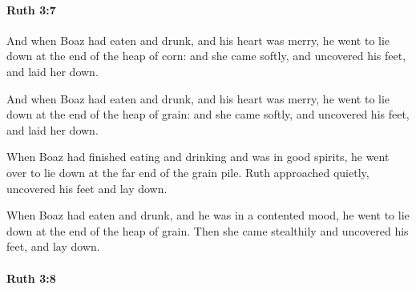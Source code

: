 		\paragraph{Ruth 3:7} %
			\label{RUTH-3-7}

			And when Boaz had eaten and drunk, and his heart was merry, he went to lie down at the end of the heap of corn: and she came softly, and uncovered his feet, and laid her down.

			\begin{versebox}
					\item[BHS] 
					\item[LXX] 
					\item[ASV] And when Boaz had eaten and drunk, and his heart was merry, he went to lie down at the end of the heap of grain: and she came softly, and uncovered his feet, and laid her down.
					\item[NIV] When Boaz had finished eating and drinking and was in good spirits, he went over to lie down at the far end of the grain pile. Ruth approached quietly, uncovered his feet and lay down.
					\item[NRSV] When Boaz had eaten and drunk, and he was in a contented mood, he went to lie down at the end of the heap of grain. Then she came stealthily and uncovered his feet, and lay down.
			\end{versebox}

		\paragraph{Ruth 3:8} %
			\label{RUTH-3-8}

